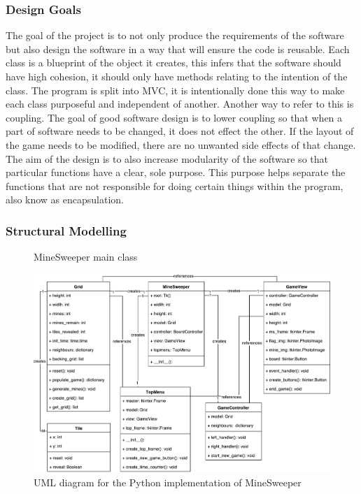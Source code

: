\documentclass[12pt, a4]{report}
\begin{document}
	\subsubsection{Design Goals}
	\par The goal of the project is to not only produce the requirements of the software but also design the software in a way that will ensure the code is reusable. Each class is a blueprint of the object it creates, this infers that the software should have high cohesion, it should only have methods relating to the intention of the class. The program is split into MVC, it is intentionally done this way to make each class purposeful and independent of another. Another way to refer to this is coupling. The goal of good software design is to lower coupling so that when a part of software needs to be changed, it does not effect the other. If the layout of the game needs to be modified, there are no unwanted side effects of that change. The aim of the design is to also increase modularity of the software so that particular functions have a clear, sole purpose. This purpose helps separate the functions that are not responsible for doing certain things within the program, also know as encapsulation. 


	\subsubsection{Structural Modelling}
	\begin{figure}[h]
		
		\caption{MineSweeper main class}
	\end{figure}
	\begin{figure}[!h]
	\centering
	\includegraphics[scale=0.6]{UML}
	\caption{UML diagram for the Python implementation of MineSweeper}
\end{figure}
\end{document}
